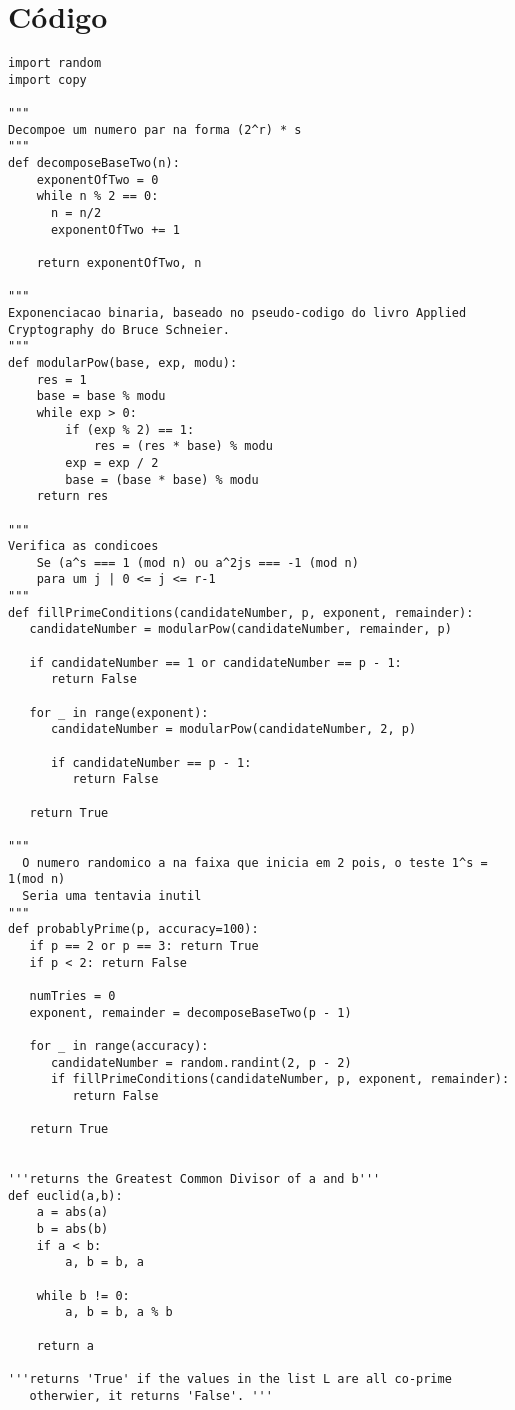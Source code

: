 \documentclass[a4paper,11pt]{article}
\theoremstyle{mytheor}
\begin{document}
\section*{Código}
\begin{lstlisting}[]
import random
import copy

"""
Decompoe um numero par na forma (2^r) * s
"""
def decomposeBaseTwo(n):
    exponentOfTwo = 0
    while n % 2 == 0:
      n = n/2
      exponentOfTwo += 1
 
    return exponentOfTwo, n

"""
Exponenciacao binaria, baseado no pseudo-codigo do livro Applied Cryptography do Bruce Schneier.
"""
def modularPow(base, exp, modu):
    res = 1
    base = base % modu
    while exp > 0:
        if (exp % 2) == 1:
            res = (res * base) % modu
        exp = exp / 2
        base = (base * base) % modu
    return res

"""
Verifica as condicoes
    Se (a^s === 1 (mod n) ou a^2js === -1 (mod n) 
    para um j | 0 <= j <= r-1
"""
def fillPrimeConditions(candidateNumber, p, exponent, remainder):
   candidateNumber = modularPow(candidateNumber, remainder, p)
 
   if candidateNumber == 1 or candidateNumber == p - 1:
      return False
 
   for _ in range(exponent):
      candidateNumber = modularPow(candidateNumber, 2, p)
 
      if candidateNumber == p - 1:
         return False
 
   return True
 
"""
  O numero randomico a na faixa que inicia em 2 pois, o teste 1^s = 1(mod n)
  Seria uma tentavia inutil
"""
def probablyPrime(p, accuracy=100):
   if p == 2 or p == 3: return True
   if p < 2: return False
 
   numTries = 0
   exponent, remainder = decomposeBaseTwo(p - 1)
 
   for _ in range(accuracy):
      candidateNumber = random.randint(2, p - 2)
      if fillPrimeConditions(candidateNumber, p, exponent, remainder):
         return False
 
   return True


'''returns the Greatest Common Divisor of a and b'''
def euclid(a,b):
    a = abs(a)
    b = abs(b)
    if a < b:
        a, b = b, a

    while b != 0:
        a, b = b, a % b

    return a

'''returns 'True' if the values in the list L are all co-prime
   otherwier, it returns 'False'. '''


\end{lstlisting}
\end{document}
